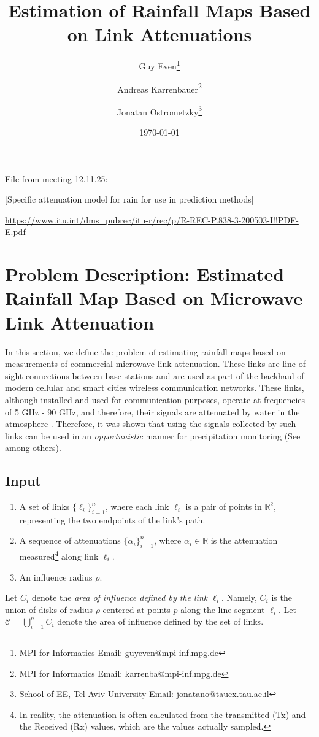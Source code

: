 \documentclass{article}
\title{Estimation of Rainfall Maps Based on Link Attenuations}
\author{Guy Even\thanks{MPI for Informatics Email: guyeven@mpi-inf.mpg.de} 
\and
Andreas Karrenbauer\thanks{MPI for Informatics Email: karrenba@mpi-inf.mpg.de}
\and Jonatan Ostrometzky\thanks{School of EE, Tel-Aviv University Email: jonatano@tauex.tau.ac.il}}
\date{\today}
\newcommand{\R}{\mathbb{R}}
\begin{document}
\maketitle

File from meeting 12.11.25: 

[Specific attenuation model for rain for use in prediction methods]

\url{https://www.itu.int/dms_pubrec/itu-r/rec/p/R-REC-P.838-3-200503-I!!PDF-E.pdf}

\section{Problem Description: Estimated Rainfall Map Based on Microwave Link Attenuation}
In this section, we define the problem of estimating rainfall maps based on measurements of commercial microwave link attenuation. These links are line-of-sight connections between base-stations and are used as part of the backhaul of modern cellular and smart cities wireless communication networks. These links, although installed and used for communication purposes, operate at frequencies of 5 GHz - 90 GHz, and therefore, their signals are attenuated by water in the atmosphere \cite{ITU,ITU530}. Therefore, it was shown that using the signals collected by such links can be used in an \emph{opportunistic} manner for precipitation monitoring (See \cite{RemkoCountry2,ostrometzky2020statistical,chwala2015real} among others).
\subsection{Input}
\begin{enumerate}
    \item A set of links $\{\ell_i\}_{i=1}^n$, where each link $\ell_i$ is a pair of points in $\R^2$, representing the two endpoints of the link's path.
    \item A sequence of attenuations $\{\alpha_i\}_{i=1}^n$, where $\alpha_i\in\R$ is the attenuation measured\footnote{In reality, the attenuation is often calculated from the transmitted (Tx) and the Received (Rx) values, which are the values actually sampled.} along link $\ell_i$.
    \item An influence radius $\rho$.
\end{enumerate}

Let $C_i$ denote the \emph{area of influence defined by the link $\ell_i$}. Namely, $C_i$ is the union of disks of radius $\rho$ centered at points $p$ along the line segment $\ell_i$. 
Let $\mathcal{C}=\bigcup_{i=1}^n C_i$ denote the area of influence defined by the set of links.
\end{document}
